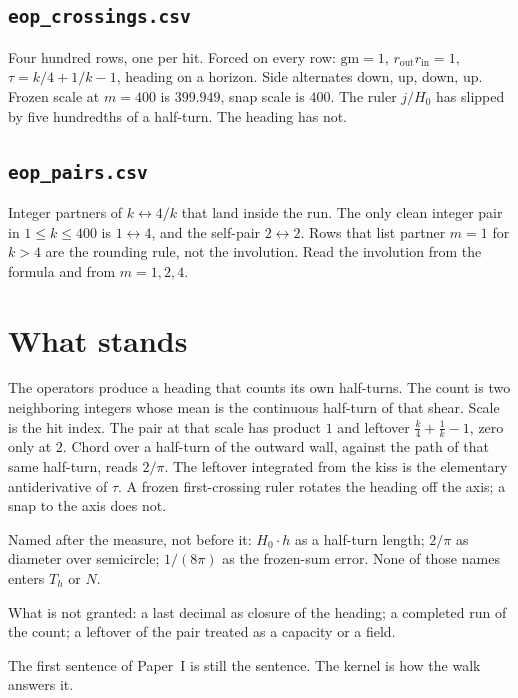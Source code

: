 \documentclass[10pt,a4paper]{article}
\theoremstyle{plain}
\theoremstyle{definition}
\theoremstyle{remark}
\begin{document}
\subsection{\texttt{eop\_crossings.csv}}

Four hundred rows, one per hit.
Forced on every row: \(\mathrm{gm}=1\), \(r_{\mathrm{out}}r_{\mathrm{in}}=1\), \(\tau=k/4+1/k-1\), heading on a horizon.
Side alternates down, up, down, up.
Frozen scale at \(m=400\) is \(399.949\), snap scale is \(400\).
The ruler \(j/H_0\) has slipped by five hundredths of a half-turn.
The heading has not.

\subsection{\texttt{eop\_pairs.csv}}

Integer partners of \(k\leftrightarrow 4/k\) that land inside the run.
The only clean integer pair in \(1\le k\le 400\) is \(1\leftrightarrow 4\), and the self-pair \(2\leftrightarrow 2\).
Rows that list partner \(m=1\) for \(k>4\) are the rounding rule, not the involution.
Read the involution from the formula and from \(m=1,2,4\).

\section{What stands}

The operators produce a heading that counts its own half-turns.
The count is two neighboring integers whose mean is the continuous half-turn of that shear.
Scale is the hit index.
The pair at that scale has product \(1\) and leftover \(\frac k4+\frac1k-1\), zero only at \(2\).
Chord over a half-turn of the outward wall, against the path of that same half-turn, reads \(2/\pi\).
The leftover integrated from the kiss is the elementary antiderivative of \(\tau\).
A frozen first-crossing ruler rotates the heading off the axis; a snap to the axis does not.

Named after the measure, not before it: \(H_0\cdot h\) as a half-turn length; \(2/\pi\) as diameter over semicircle; \(1/(8\pi)\) as the frozen-sum error.
None of those names enters \(T_h\) or \(N\).

What is not granted: a last decimal as closure of the heading; a completed run of the count; a leftover of the pair treated as a capacity or a field.

The first sentence of Paper~I is still the sentence.
The kernel is how the walk answers it.
\end{document}
